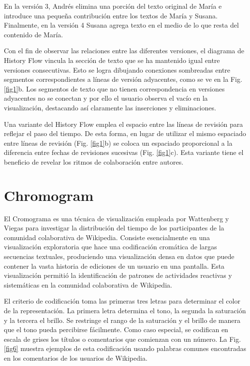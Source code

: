 En la versión 3, Andrés elimina una porción del texto original de María e introduce una pequeña contribución entre los textos de María y Susana. Finalmente, en la versión 4 Susana agrega texto en el medio de lo que resta del contenido de María.

Con el fin de observar las relaciones entre las diferentes versiones, el diagrama de History Flow vincula la sección de texto que se ha mantenido igual entre versiones consecutivas. Esto se logra dibujando conexiones sombreadas entre segmentos correspondientes a líneas de versión adyacentes, como se ve en la Fig. \ref{fig1}b. Los segmentos de texto que no tienen correspondencia en versiones adyacentes no se conectan y por ello el usuario observa el vacío en la visualización, destacando así claramente las inserciones y eliminaciones.

Una variante del History Flow emplea el espacio entre las líneas de revisión para reflejar el paso del tiempo. De esta forma, en lugar de utilizar el mismo espaciado entre líneas de revisión (Fig. \ref{fig1}b) se coloca un espaciado proporcional a la diferencia entre fechas de revisiones sucesivas (Fig. \ref{fig1}c). Esta variante tiene el beneficio de revelar los ritmos de colaboración entre autores.

\section{Chromogram}
El Cromograma es una técnica de visualización empleada por Wattenberg y Viegas \cite{Wattenberg2007a} para investigar la distribución del tiempo de los participantes de la comunidad colaborativa de Wikipedia. Consiste esencialmente en una visualización exploratoria que hace una codificación cromática de largas secuencias textuales, produciendo una visualización densa en datos que puede contener la vasta historia de ediciones de un usuario en una pantalla. Esta visualización permitió la identificación de patrones de actividades reactivas y sistemáticas en la comunidad colaborativa de Wikipedia.

El criterio de codificación toma las primeras tres letras para determinar el color de la representación. La primera letra determina el tono, la segunda la saturación y la tercera el brillo. Se restringe el rango de la saturación y el brillo de manera que el tono pueda percibirse fácilmente. Como caso especial, se codifican en escala de grises los títulos o comentarios que comienzan con un número.  La Fig. \ref{fig6} muestra ejemplos de esta codificación usando palabras comunes encontradas en los comentarios de los usuarios de Wikipedia.

